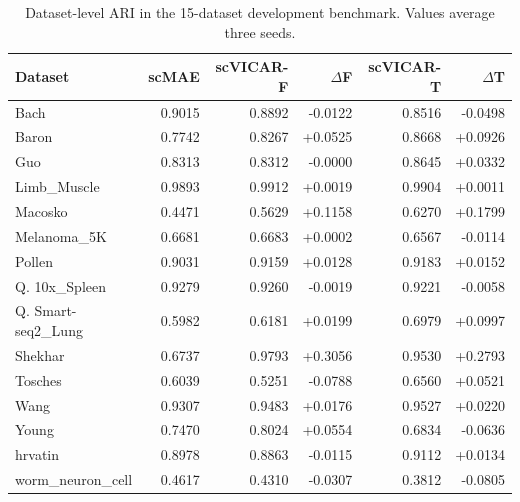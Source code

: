 \begin{table}[t]
\centering
\small
\setlength{\tabcolsep}{7pt}
\caption{Dataset-level ARI in the 15-dataset development benchmark. Values average three seeds.}
\label{tab:development-dataset-ari}
\begin{tabular}{lrrrrr}
\toprule
Dataset & scMAE & scVICAR-F & $\Delta$F & scVICAR-T & $\Delta$T \\
\midrule
Bach & 0.9015 & 0.8892 & -0.0122 & 0.8516 & -0.0498 \\
Baron & 0.7742 & 0.8267 & +0.0525 & 0.8668 & +0.0926 \\
Guo & 0.8313 & 0.8312 & -0.0000 & 0.8645 & +0.0332 \\
Limb\_Muscle & 0.9893 & 0.9912 & +0.0019 & 0.9904 & +0.0011 \\
Macosko & 0.4471 & 0.5629 & +0.1158 & 0.6270 & +0.1799 \\
Melanoma\_5K & 0.6681 & 0.6683 & +0.0002 & 0.6567 & -0.0114 \\
Pollen & 0.9031 & 0.9159 & +0.0128 & 0.9183 & +0.0152 \\
Q. 10x\_Spleen & 0.9279 & 0.9260 & -0.0019 & 0.9221 & -0.0058 \\
Q. Smart-seq2\_Lung & 0.5982 & 0.6181 & +0.0199 & 0.6979 & +0.0997 \\
Shekhar & 0.6737 & 0.9793 & +0.3056 & 0.9530 & +0.2793 \\
Tosches & 0.6039 & 0.5251 & -0.0788 & 0.6560 & +0.0521 \\
Wang & 0.9307 & 0.9483 & +0.0176 & 0.9527 & +0.0220 \\
Young & 0.7470 & 0.8024 & +0.0554 & 0.6834 & -0.0636 \\
hrvatin & 0.8978 & 0.8863 & -0.0115 & 0.9112 & +0.0134 \\
worm\_neuron\_cell & 0.4617 & 0.4310 & -0.0307 & 0.3812 & -0.0805 \\
\bottomrule
\end{tabular}
\end{table}
